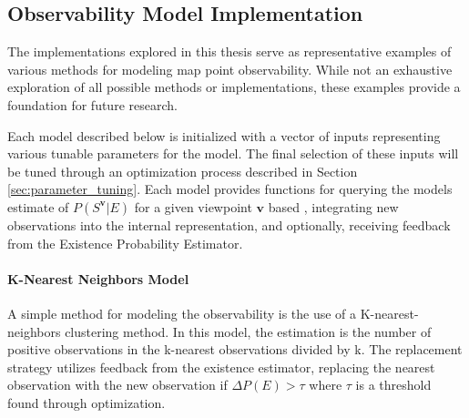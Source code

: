 \subsection{Observability Model Implementation}

The implementations explored in this thesis serve as representative examples of various methods for modeling map point observability. While not an exhaustive exploration of all possible methods or implementations, these examples provide a foundation for future research.

Each model described below is initialized with a vector of inputs representing various tunable parameters for the model. The final selection of these inputs will be tuned through an optimization process described in Section \ref{sec:parameter_tuning}. Each model provides functions for querying the models estimate of $P(S^{\boldsymbol{v}}|E)$ for a given viewpoint $\boldsymbol{v}$ based , integrating new observations into the internal representation, and optionally, receiving feedback from the Existence Probability Estimator.

\paragraph{K-Nearest Neighbors Model}

A simple method for modeling the observability is the use of a K-nearest-neighbors clustering method. In this model, the estimation is the number of positive observations in the k-nearest observations divided by k. The replacement strategy utilizes feedback from the existence estimator, replacing the nearest observation with the new observation if $\Delta P(E) > \tau$ where $\tau$ is a threshold found through optimization.


